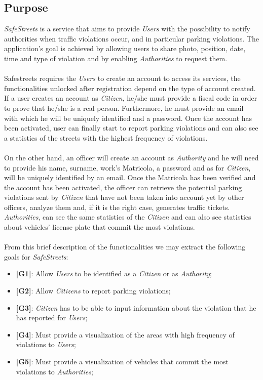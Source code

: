 \documentclass{article}
\begin{document}
\subsection{Purpose}
\textit{SafeStreets} is a service that aims to provide \textit{Users} with the possibility to notify authorities when traffic 
violations occur, and in particular parking violations. The application's goal is achieved by allowing users 
to share photo, position, date, time and type of violation and by enabling \textit{Authorities} to request them.
\\
\\
Safestreets requires the \textit{Users} to create an account to access its services, the functionalities unlocked after 
registration depend on the type of account created.
\\
If a user creates an account as \textit{Citizen}, he/she must provide a fiscal code in order to prove 
that he/she is a real person. Furthermore, he must provide an email with which he will be uniquely identified 
and a password. Once the account has been activated, user can finally start to report parking violations and can also see 
a statistics of the streets with the highest frequency of violations.
\\
\\
On the other hand, an officer will create an account as \textit{Authority} and he will need to provide his name, surname, 
work's Matricola, a password and as for \textit{Citizen}, will be uniquely identified by an email. Once the Matricola 
has been verified and the account has been activated, the officer can retrieve the potential parking violations 
sent by \textit{Citizen} that have not been taken into account yet by other officers, analyze them and, if it is the 
right case, generates traffic tickets. \textit{Authorities}, can see the same statistics of the \textit{Citizen} and can also see
statistics about vehicles' license plate that commit the most violations.
\\
\\
From this brief description of the functionalities we may extract the following goals for \textit{SafeStreets}:
\begin{itemize}
    \item \textbf{[G1]}: Allow \textit{Users} to be identified as a \textit{Citizen} or as \textit{Authority};
    \item \textbf{[G2]}: Allow \textit{Citizens} to report parking violations;
    \item \textbf{[G3]}: \textit{Citizen} has to be able to input information about the violation that he has reported for \textit{Users};
    \item \textbf{[G4]}: Must provide a visualization of the areas with high frequency of violations to \textit{Users};
    \item \textbf{[G5]}: Must provide a visualization of vehicles that commit the most violations to \textit{Authorities}; 

\end{itemize}
\end{document}
